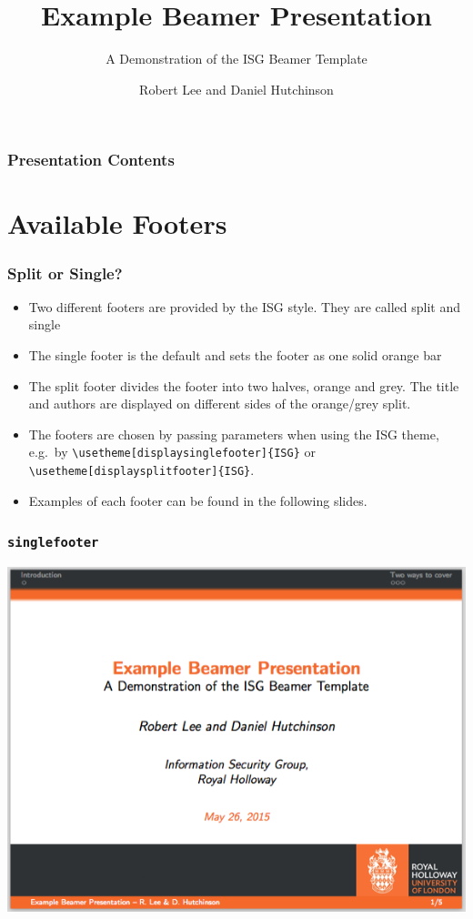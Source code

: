 \documentclass[]{beamer}
\title{Example Beamer Presentation}
\subtitle{A Demonstration of the ISG Beamer Template}
\author[R. Lee \& D. Hutchinson]{Robert Lee and Daniel Hutchinson}
\institute{Information Security Group,\\
Royal Holloway}
\begin{document}
\begin{frame}
	\titlepage
\end{frame}

\begin{frame}\frametitle{Presentation Contents}
	\tableofcontents
\end{frame}

\section{Available Footers}
\begin{frame}\frametitle{Split or Single?}
\begin{itemize}
	\item Two different footers are provided by the ISG style.  They are called split and single
	\item The single footer is the default and sets the footer as one solid orange bar
	\item The split footer divides the footer into two halves, orange and grey.  The title and authors are displayed on different sides of the orange/grey split.
	\item The footers are chosen by passing parameters when using the ISG theme, e.g.\ by \texttt{\textbackslash usetheme[displaysinglefooter]\{ISG\}} or \texttt{\textbackslash usetheme[displaysplitfooter]\{ISG\}}.
	\item Examples of each footer can be found in the following slides.
\end{itemize}
\end{frame}

\begin{frame}\frametitle{\texttt{singlefooter}}
\begin{center}
	\includegraphics[scale=0.4]{graphics/singlefooter.png}
\end{center}
\end{frame}
\end{document}
